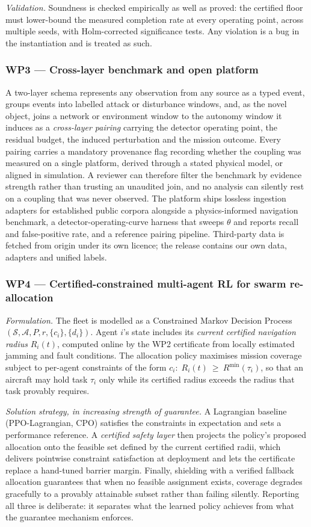 \documentclass[11pt,a4paper]{article}
\begin{document}
\emph{Validation.} Soundness is checked empirically as well as proved: the certified floor must lower-bound the measured completion rate at every operating point, across multiple seeds, with Holm-corrected significance tests. Any violation is a bug in the instantiation and is treated as such.

\subsubsection{WP3 --- Cross-layer benchmark and open platform}
A two-layer schema represents any observation from any source as a typed event, groups events into labelled attack or disturbance windows, and, as the novel object, joins a network or environment window to the autonomy window it induces as a \emph{cross-layer pairing} carrying the detector operating point, the residual budget, the induced perturbation and the mission outcome. Every pairing carries a mandatory provenance flag recording whether the coupling was measured on a single platform, derived through a stated physical model, or aligned in simulation. A reviewer can therefore filter the benchmark by evidence strength rather than trusting an unaudited join, and no analysis can silently rest on a coupling that was never observed. The platform ships lossless ingestion adapters for established public corpora alongside a physics-informed navigation benchmark, a detector-operating-curve harness that sweeps $\theta$ and reports recall and false-positive rate, and a reference pairing pipeline. Third-party data is fetched from origin under its own licence; the release contains our own data, adapters and unified labels.

\subsubsection{WP4 --- Certified-constrained multi-agent RL for swarm re-allocation}
\emph{Formulation.} The fleet is modelled as a Constrained Markov Decision Process $(\mathcal S,\mathcal A,P,r,\{c_i\},\{d_i\})$. Agent $i$'s state includes its \emph{current certified navigation radius} $R_i(t)$, computed online by the WP2 certificate from locally estimated jamming and fault conditions. The allocation policy maximises mission coverage subject to per-agent constraints of the form $c_i:\;R_i(t)\ \ge\ R^{\min}(\tau_i)$, so that an aircraft may hold task $\tau_i$ only while its certified radius exceeds the radius that task provably requires.

\emph{Solution strategy, in increasing strength of guarantee.} A Lagrangian baseline (PPO-Lagrangian, CPO) satisfies the constraints in expectation and sets a performance reference. A \emph{certified safety layer} then projects the policy's proposed allocation onto the feasible set defined by the current certified radii, which delivers pointwise constraint satisfaction at deployment and lets the certificate replace a hand-tuned barrier margin. Finally, shielding with a verified fallback allocation guarantees that when no feasible assignment exists, coverage degrades gracefully to a provably attainable subset rather than failing silently. Reporting all three is deliberate: it separates what the learned policy achieves from what the guarantee mechanism enforces.
\end{document}

